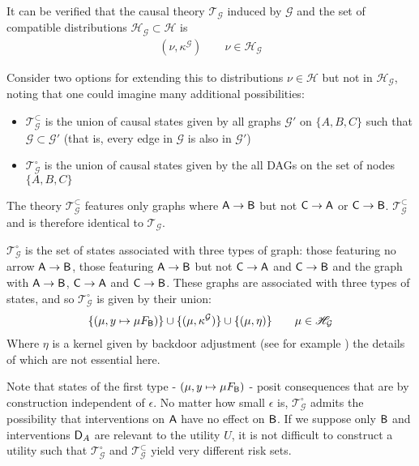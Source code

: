 \begin{example}
It can be verified that the causal theory $\mathscr{T}_{\mathcal{G}}$ induced by $\mathcal{G}$ and the set of compatible distributions $\mathscr{H}_\mathcal{G}\subset\mathscr{H}$ is
\begin{align}
    (\nu,\kappa^{\mathcal{G}} ) \qquad \nu\in \mathscr{H}_{\mathcal{G}} \label{eq:ocbn}
\end{align}

Consider two options for extending this to distributions $\nu\in \mathscr{H}$ but not in $\mathscr{H}_{\mathcal{G}}$, noting that one could imagine many additional possibilities:
\begin{itemize}
    \item $\mathscr{T}_{\mathcal{G}}^\subset$ is the union of causal states given by all graphs $\mathcal{G}'$ on $\{A, B, C\}$ such that $\mathcal{G}\subset \mathcal{G}'$ (that is, every edge in $\mathcal{G}$ is also in $\mathcal{G}'$)
    \item $\mathscr{T}_{\mathcal{G}}^\circ$ is the union of causal states given by the all DAGs on the set of nodes $\{A, B, C\}$
\end{itemize}

The theory $\mathscr{T}_{\mathcal{G}}^\subset$ features only graphs where $\mathsf{A}\to \mathsf{B}$ but not $\mathsf{C}\to\mathsf{A}$ or $\mathsf{C}\to \mathsf{B}$. $\mathscr{T}_{\mathcal{G}}^\subset$ and is therefore identical to $\mathscr{T}_\mathcal{G}$.

$\mathscr{T}_{\mathcal{G}}^\circ$ is the set of states associated with three types of graph: those featuring no arrow $\mathsf{A}\to\mathsf{B}$, those featuring $\mathsf{A}\to \mathsf{B}$ but not $\mathsf{C}\to\mathsf{A}$ and $\mathsf{C}\to \mathsf{B}$ and the graph with $\mathsf{A}\to \mathsf{B}$, $\mathsf{C}\to \mathsf{A}$ and $\mathsf{C}\to \mathsf{B}$. These graphs are associated with three types of states, and so $\mathscr{T}_{\mathcal{G}}^\circ$ is given by their union:
\begin{align}
    \{(\mu,y\mapsto \mu F_{\mathsf{B}})\} \cup \{(\mu,\kappa^\mathcal{G})\} \cup \{(\mu,\eta) \}\qquad \mu\in \mathscr{H}_{\mathcal{G}}
\end{align}
Where $\eta$ is a kernel given by backdoor adjustment (see for example \cite{maathuis_estimating_2009}) the details of which are not essential here. 

Note that states of the first type - $(\mu,y\mapsto \mu F_{\mathsf{B}})$ - posit consequences that are by construction independent of $\epsilon$. No matter how small $\epsilon$ is, $\mathscr{T}_{\mathcal{G}}^\circ$ admits the possibility that interventions on $\mathsf{A}$ have no effect on $\mathsf{B}$. If we suppose only $\mathsf{B}$ and interventions $\mathsf{D}_A$ are relevant to the utility $U$, it is not difficult to construct a utility such that $\mathscr{T}_{\mathcal{G}}^\circ$ and $\mathscr{T}_{\mathcal{G}}^\subset$ yield very different risk sets.


\end{example}
